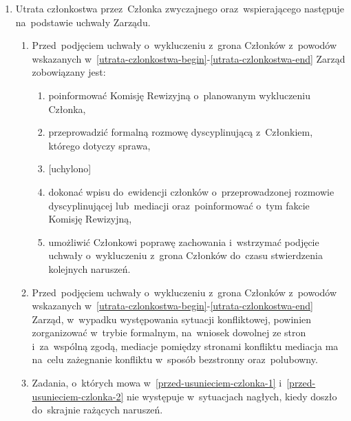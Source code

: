 \documentclass{article}
\begin{document}
\begin{enumerate}
\begin{enumerate}
\begin{enumerate}
            \item braku wpłat składek członkowskich za~okres trzech miesięcy,
            \item łamania zasad współżycia społecznego,
            \item działania na~szkodę Stowarzyszenia, \label{utrata-czlonkostwa-end}
            \item śmierci Członka.
          \end{enumerate}
        \item {[uchylono]}
        \item {[uchylono]}
      \end{enumerate}
      \item Utrata członkostwa przez~Członka zwyczajnego oraz~wspierającego następuje na~podstawie uchwały Zarządu.
      \begin{enumerate}
        \item Przed~podjęciem uchwały o~wykluczeniu z~grona Członków z~powodów wskazanych w~\ref{utrata-czlonkostwa-begin}-\ref{utrata-czlonkostwa-end} Zarząd zobowiązany jest: \label{przed-usunieciem-czlonka-1}
        \begin{enumerate}
          \item poinformować Komisję Rewizyjną o~planowanym wykluczeniu Członka,
          \item przeprowadzić formalną rozmowę dyscyplinującą z~Członkiem, którego dotyczy sprawa,
          \item {[uchylono]}
          \item dokonać wpisu do~ewidencji członków o~przeprowadzonej rozmowie dyscyplinującej lub~mediacji oraz~poinformować o~tym fakcie Komisję Rewizyjną,
          \item umożliwić Członkowi poprawę zachowania i~wstrzymać podjęcie uchwały o~wykluczeniu z~grona Członków do~czasu stwierdzenia kolejnych naruszeń.
        \end{enumerate}
        \item Przed~podjęciem uchwały o~wykluczeniu z~grona Członków z~powodów wskazanych w~\ref{utrata-czlonkostwa-begin}-\ref{utrata-czlonkostwa-end} Zarząd, w~wypadku występowania sytuacji konfliktowej, powinien zorganizować w~trybie formalnym, na~wniosek dowolnej ze stron i~za~wspólną zgodą, mediacje pomiędzy stronami konfliktu \ppauza mediacja ma na~celu zażegnanie konfliktu w~sposób bezstronny oraz~polubowny. \label{przed-usunieciem-czlonka-2}
        \item Zadania, o~których mowa w~\ref{przed-usunieciem-czlonka-1} i~\ref{przed-usunieciem-czlonka-2} nie występuje w~sytuacjach nagłych, kiedy doszło do~skrajnie rażących naruszeń.

\end{enumerate}
\end{enumerate}
\end{document}
